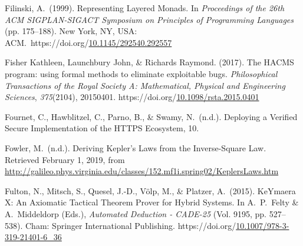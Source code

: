 \documentclass[12pt,twoside]{article}
\begin{document}
{\begin{thebibliography}{222}
\mdbibitemlabel{[Filinski, 1999]}Filinski, A.~(1999). Representing Layered Monads. In \emph{Proceedings of the 26th ACM SIGPLAN-SIGACT Symposium on Principles of Programming Languages} (pp. 175–188). New York, NY, USA: ACM.~https://doi.org/\href{https://dx.doi.org/10.1145/292540.292557}{10.1145/292540.292557}\label{filinski_representing_1999}%

Fisher Kathleen, Launchbury John, \& Richards Raymond. (2017). The HACMS program: using formal methods to eliminate exploitable bugs. \emph{Philosophical Transactions of the Royal Society A: Mathematical, Physical and Engineering Sciences}, \emph{375}(2104), 20150401. https://doi.org/\href{https://dx.doi.org/10.1098/rsta.2015.0401}{10.1098/rsta.2015.0401}\label{fisher_kathleen_hacms_2017}%

Fournet, C., Hawblitzel, C., Parno, B., \& Swamy, N.~(n.d.). Deploying a Veriﬁed Secure Implementation of the HTTPS Ecosystem, 10.\label{fournet_deploying_nodate}%

\mdbibitemlabel{[Fowler, n.d.]}Fowler, M.~(n.d.). Deriving Kepler’s Laws from the Inverse-Square Law. Retrieved February 1, 2019, from \href{http://galileo.phys.virginia.edu/classes/152.mf1i.spring02/KeplersLaws.htm}{{\ttfamily http://\hspace{0pt}galileo.\hspace{0pt}phys.\hspace{0pt}virginia.\hspace{0pt}edu/\hspace{0pt}classes/\hspace{0pt}152.\hspace{0pt}mf1i.\hspace{0pt}spring02/\hspace{0pt}KeplersLaws.\hspace{0pt}htm}}\label{fowler_deriving_nodate}%

Fulton, N., Mitsch, S., Quesel, J.-D., Völp, M., \& Platzer, A.~(2015). KeYmaera X: An Axiomatic Tactical Theorem Prover for Hybrid Systems. In A.~P.~Felty \& A.~Middeldorp (Eds.), \emph{Automated Deduction - CADE-25} (Vol. 9195, pp. 527–538). Cham: Springer International Publishing. https://doi.org/\href{https://dx.doi.org/10.1007/978-3-319-21401-6_36}{10.1007/978-3-319-21401-6\_36}\label{felty_keymaera_2015}%


\end{thebibliography}}
\end{document}
